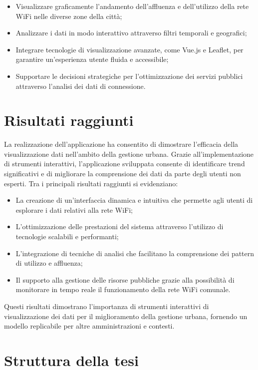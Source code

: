 \begin{itemize}
    \item Visualizzare graficamente l'andamento dell'affluenza e dell'utilizzo della rete WiFi nelle diverse zone della città;
    \item Analizzare i dati in modo interattivo attraverso filtri temporali e geografici;
    \item Integrare tecnologie di visualizzazione avanzate, come Vue.js e Leaflet, per garantire un'esperienza utente fluida e accessibile;
    \item Supportare le decisioni strategiche per l'ottimizzazione dei servizi pubblici attraverso l'analisi dei dati di connessione.
\end{itemize}

\section*{Risultati raggiunti}

La realizzazione dell'applicazione ha consentito di dimostrare l'efficacia della visualizzazione dati nell'ambito della gestione urbana. Grazie all'implementazione di strumenti interattivi, l'applicazione sviluppata consente di identificare trend significativi e di migliorare la comprensione dei dati da parte degli utenti non esperti. Tra i principali risultati raggiunti si evidenziano:

\begin{itemize}
    \item La creazione di un'interfaccia dinamica e intuitiva che permette agli utenti di esplorare i dati relativi alla rete WiFi;
    \item L'ottimizzazione delle prestazioni del sistema attraverso l'utilizzo di tecnologie scalabili e performanti;
    \item L'integrazione di tecniche di analisi che facilitano la comprensione dei pattern di utilizzo e affluenza;
    \item Il supporto alla gestione delle risorse pubbliche grazie alla possibilità di monitorare in tempo reale il funzionamento della rete WiFi comunale.
\end{itemize}

Questi risultati dimostrano l'importanza di strumenti interattivi di visualizzazione dei dati per il miglioramento della gestione urbana, fornendo un modello replicabile per altre amministrazioni e contesti.

\section*{Struttura della tesi}

